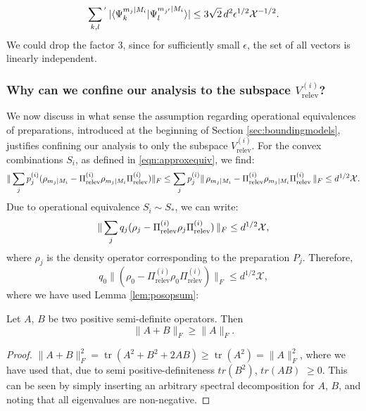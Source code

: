 \begin{equation}
\label{eqn:overlapbound}
\sum_{k,l}{}^{'}\thinspace\vert\langle \Psi_k^{m_j\vert M_i} \vert \Psi_l^{m_{j'}\vert M_i}\rangle \vert \leq 3\sqrt{2}\thinspace d^2 \epsilon^{1/2}\mathcal{X}^{-1/2}.
\end{equation}
We could drop the factor $3$, since for sufficiently small $\epsilon$, the set of all vectors is linearly independent.

\subsubsection{Why can we confine our analysis to the subspace $V_{\text{relev}}^{(i)}$?}
We now discuss in what sense the assumption regarding operational equivalences of preparations, introduced at the beginning of Section \ref{sec:boundingmodels}, justifies confining our analysis to only the subspace $V_{\text{relev}}^{(i)}$. 
For the convex combinations $S_i$, as defined in \ref{eqn:approxequiv}, we find:
\begin{equation*}
\|\sum_j p_j^{(i)}(\rho_{m_j\vert M_i}-\Pi_{\text{relev}}^{(i)}\rho_{m_j\vert M_i}\Pi_{\text{relev}}^{(i)})\|_F \leq \sum_j p_j^{(i)}\|\thinspace\rho_{m_j\vert M_i}-\Pi_{\text{relev}}^{(i)}\rho_{m_j\vert M_i}\Pi_{\text{relev}}^{(i)}\thinspace\|_F \leq d^{1/2}\mathcal{X}.
\end{equation*}
Due to operational equivalence $S_i\sim S_{*}$, we can write:
\begin{equation*}
\|\sum_j q_j(\rho_{j}-\Pi_{\text{relev}}^{(i)}\rho_{j}\Pi_{\text{relev}}^{(i)})\thinspace\|_F \leq d^{1/2}\mathcal{X},
\end{equation*}
where $\rho_{j}$ is the density operator corresponding to the preparation $P_j$.
Therefore,
\begin{equation}
\label{eqn:sumtobound}
q_0\|(\rho_{0}-\Pi_{\text{relev}}^{(i)}\rho_{0}\Pi_{\text{relev}}^{(i)})\|_F \leq d^{1/2}\mathcal{X},
\end{equation}
where we have used Lemma \ref{lem:posopsum}:
\begin{lemma}
\label{lem:posopsum}
Let $A$, $B$ be two positive semi-definite operators. Then
\begin{equation*}
\|A+B\|_F \geq \|A\|_F.
\end{equation*}
\end{lemma}
\begin{proof}
$\|A+B\|_F^2=\operatorname{tr}(A^2+B^2+2AB)\geq \operatorname{tr}(A^2)=\|A\|_F^2$, where we have used that, due to semi positive-definiteness $tr(B^2)$, $tr(AB)$ $\geq 0$. This can be seen by simply inserting an arbitrary spectral decomposition for $A$, $B$, and noting that all eigenvalues are non-negative.
\end{proof}
